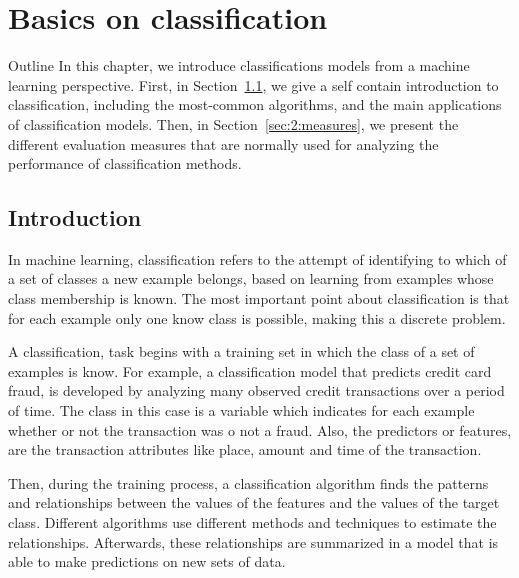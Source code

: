 \chapter{Basics on classification}\label{ch:2}

\begin{remark}{Outline}
In this chapter, we introduce classifications models from a machine learning perspective. 
First, in Section~\ref{sec:2:classification}, we give a self contain introduction to 
classification, including the most-common algorithms, and the main applications of 
classification models. Then, in Section~\ref{sec:2:measures}, we present the different evaluation 
measures that are normally used for analyzing the performance of classification methods.
\end{remark}

\section{Introduction}
\label{sec:2:classification}

In machine learning, classification refers to the attempt of identifying to which of a set of 
classes a new example belongs, based on learning from examples whose class membership is known. 
The most important point about classification is that for each example only one know class is 
possible, making this a discrete problem. 

A classification, task begins with a training set in which the class of a set of examples is know. 
For example, a classification model that predicts credit card fraud, is developed by analyzing 
many observed credit transactions over a period of time. The class in this case is a variable which 
indicates for each example whether or not the transaction was o not a fraud. Also, the predictors 
or features, are the transaction attributes like place, amount and time of the transaction.

Then, during the training process, a classification algorithm finds the patterns and relationships 
between the values of the features and the values of the target class. Different algorithms use 
different methods and techniques to estimate the relationships. Afterwards, these relationships are 
summarized in a model that is able to make predictions on new sets of data.

